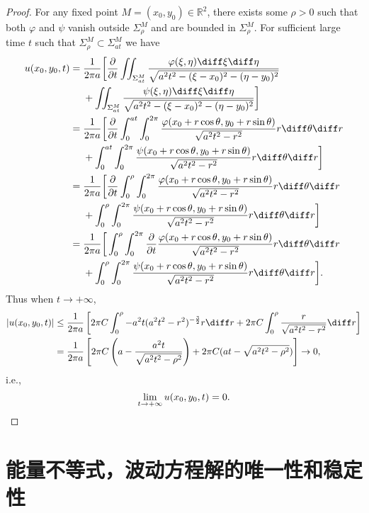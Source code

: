 \begin{proof}
  For any fixed point $M=(x_0,y_0)\in\mathbb{R}^2$, there exists some $\rho>0$
  such that both $\varphi$ and $\psi$ vanish outside $\Sigma_\rho^M$ and are
  bounded in $\Sigma_\rho^M$.
  For sufficient large time $t$ such that $\Sigma_\rho^M\subset \Sigma_{at}^M$ we have
  \begin{align*}
    u(x_0,y_0,t) = {} 
    & \frac{1}{2\pi a}\biggl[\frac{\partial}{\partial t}
      \iint_{\Sigma_{at}^M}
      \frac{\varphi(\xi,\eta)\diff\xi\diff\eta}{\sqrt{a^2t^2-(\xi-x_0)^2-(\eta-y_0)^2}} \\
    & + \iint_{\Sigma_{at}^M}\frac{\psi(\xi,\eta)\diff\xi\diff\eta}
      {\sqrt{a^2t^2-(\xi-x_0)^2-(\eta-y_0)^2}}\biggr] \\
={} & \frac{1}{2\pi a}\bigg[\frac{\partial}{\partial t}\int_0^{at}\int_0^{2\pi}
      \frac{\varphi(x_0+r\cos\theta,y_0+r\sin\theta)}{\sqrt{a^2t^2-r^2}}r\diff\theta\diff r \\
    & +\int_0^{at}\int_0^{2\pi}\frac{\psi(x_0+r\cos\theta,y_0+r\sin\theta)}
      {\sqrt{a^2t^2-r^2}}r\diff\theta\diff r\bigg] \\
={} & \frac{1}{2\pi a}\bigg[\frac{\partial}{\partial t}
      \int_0^{\rho}\int_0^{2\pi}\frac{\varphi(x_0+r\cos\theta,y_0+r\sin\theta)}
      {\sqrt{a^2t^2-r^2}}r\diff\theta\diff r \\
    & + \int_0^{\rho}\int_0^{2\pi}\frac{\psi(x_0+r\cos\theta,y_0+r\sin\theta)}{\sqrt{a^2t^2-r^2}}r\diff\theta\diff r\bigg] \\
={} & \frac{1}{2\pi a}\bigg[\int_0^{\rho}\int_0^{2\pi}\frac{\partial}{\partial t}
      \frac{\varphi(x_0+r\cos\theta,y_0+r\sin\theta)}{\sqrt{a^2t^2-r^2}}r\diff\theta\diff r \\
    & + \int_0^{\rho}\int_0^{2\pi}\frac{\psi(x_0+r\cos\theta,y_0+r\sin\theta)}
      {\sqrt{a^2t^2-r^2}}r\diff\theta\diff r\bigg].
  \end{align*}
  Thus when $t\to +\infty$,
  \[\begin{split}
  |u(x_0,y_0,t)|&\leq \frac{1}{2\pi a}\left[2\pi C\int_0^{\rho}-a^2t(a^2t^2-r^2)^{-\frac{3}{2}}r\diff r+2\pi C\int_0^{\rho}\frac{r}{\sqrt{a^2t^2-r^2}}\diff r\right]\\
  &=\frac{1}{2\pi a}\left[2\pi C\left(a-\frac{a^2t}{\sqrt{a^2t^2-\rho^2}}\right)+2\pi C(at-\sqrt{a^2t^2-\rho^2})\right]\to 0,
  \end{split}\]
  i.e.,
  \[\lim_{t\to+\infty}u(x_0,y_0,t) = 0.\qedhere\]
\end{proof}


\section{能量不等式，波动方程解的唯一性和稳定性}


